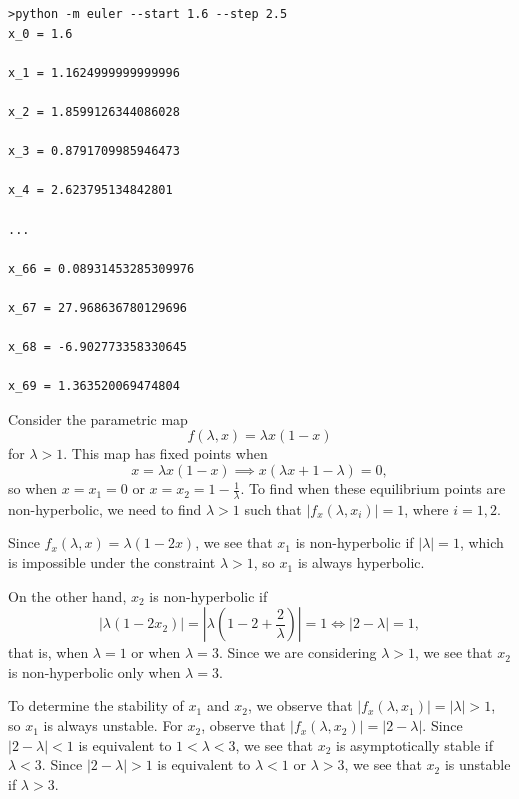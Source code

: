 \documentclass[nonumber]{homework}
\begin{document}
	
	\begin{minipage}{\linewidth}
		\begin{lstlisting}[basicstyle=\small\ttfamily, frame=single, caption={Console command and output, $h=2.5$ (abridged)}, label=lst:step2.5]
>python -m euler --start 1.6 --step 2.5
x_0 = 1.6

x_1 = 1.1624999999999996

x_2 = 1.8599126344086028

x_3 = 0.8791709985946473

x_4 = 2.623795134842801

...

x_66 = 0.08931453285309976

x_67 = 27.968636780129696

x_68 = -6.902773358330645

x_69 = 1.363520069474804
		\end{lstlisting}
	\end{minipage}
	
	\newpage
	
	
	Consider the parametric map
	\begin{equation*}
		f(\lambda, x) = \lambda x(1-x)
	\end{equation*}
	for $\lambda > 1$. This map has fixed points when
	\begin{equation*}
		x = \lambda x(1-x) \implies x(\lambda x + 1-\lambda) = 0,
	\end{equation*}
	so when $x = x_1 = 0$ or $x = x_2 = 1 - \frac{1}{\lambda}$. To find when these equilibrium points are non-hyperbolic, we need to find $\lambda > 1$ such that $|f_x(\lambda, x_i)| = 1$, where $i = 1,2$. 
	
	Since $f_x(\lambda, x) =\lambda(1-2x)$, we see that $x_1$ is non-hyperbolic if $|\lambda| = 1$, which is impossible under the constraint $\lambda > 1$, so $x_1$ is always hyperbolic.
	
	On the other hand, $x_2$ is non-hyperbolic if 
	\begin{equation*}
		|\lambda(1-2x_2)| = \left|\lambda\left(1 - 2+\frac{2}{\lambda}\right)\right| = 1 \iff |2-\lambda| = 1,
	\end{equation*}
	that is, when $\lambda =1$ or when $\lambda = 3$. Since we are considering $\lambda > 1$, we see that $x_2$ is non-hyperbolic only when $\lambda =3$.
	
	To determine the stability of $x_1$ and $x_2$, we observe that $|f_x(\lambda, x_1)| = |\lambda| > 1$, so $x_1$ is always unstable. For $x_2$, observe that $|f_x(\lambda, x_2)| = |2-\lambda|$. Since $|2-\lambda| < 1$ is equivalent to $1 < \lambda < 3$, we see that $x_2$ is asymptotically stable if $\lambda < 3$. Since $|2-\lambda| > 1$ is equivalent to $\lambda < 1$ or $\lambda>3$, we see that $x_2$ is unstable if $\lambda > 3$.
	
\end{document}
